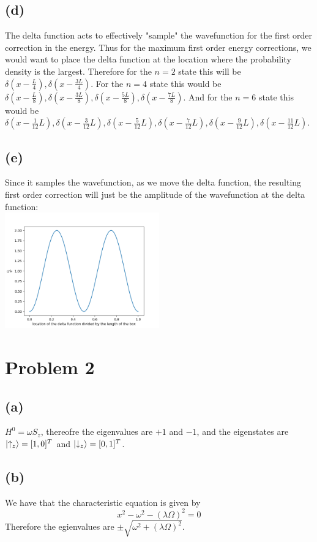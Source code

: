 \documentclass[11pt]{article}
\begin{document}
\subsection*{(d)}
The delta function acts to effectively "sample" the wavefunction for the 
first order correction in the energy. Thus for the maximum first order 
energy corrections, we would want to place the delta function 
at the location where the probability density is the largest. Therefore for the 
$n=2$ state this will be $\delta(x-\frac{L}{4}),
\delta(x-\frac{3L}{4})$. For the $n=4$ state this would be 
$\delta(x-\frac{L}{8}),\delta(x-\frac{3L}{8}),\delta(x-\frac{5L}{8}),
\delta(x-\frac{7L}{8})$. And for 
the $n=6$ state this would be
$\delta(x-\frac{1}{12}L),\delta(x-\frac{3}{12}L),\delta(x-\frac{5}{12}L),
\delta(x-\frac{7}{12}L),\delta(x-\frac{9}{12}L),\delta(x-\frac{11}{12}L)$.
\subsection*{(e)}
Since it samples the wavefunction, as we move the delta function, the resulting 
first order correction will just be the amplitude of the wavefunction at the
delta function:\\
\includegraphics*[width=0.5\textwidth]{fig1.png}
\section*{Problem 2}
\subsection*{(a)}
$H^0=\omega S_z$, thereofre the eigenvalues are $+1$ and $-1$, and the 
eigenstates are $\ket{\uparrow_z}=[1,0]^T$ and $\ket{\downarrow_z}=[0,1]^T$.
\subsection*{(b)}
We have that the characteristic equation is given by
$$x^2-\omega^2-(\lambda\Omega)^2=0$$
Therefore the egienvalues are $\pm\sqrt{\omega^2+(\lambda\Omega)^2}$.
\end{document}
